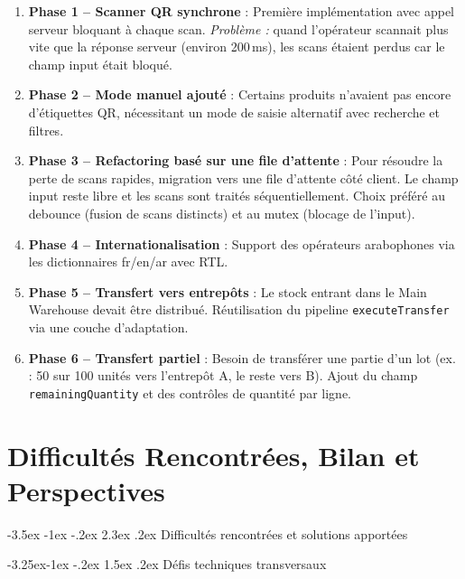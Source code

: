 \documentclass[12pt,a4paper,openany]{report}
\makeatletter
\renewcommand\section{\@startsection{section}{1}{\z@}%
  {-3.5ex \@plus -1ex \@minus -.2ex}%
  {2.3ex \@plus.2ex}%
  {\needspace{10\baselineskip}\normalfont\Large\bfseries\color{primary}}}
\renewcommand\subsection{\@startsection{subsection}{2}{\z@}%
  {-3.25ex\@plus -1ex \@minus -.2ex}%
  {1.5ex \@plus .2ex}%
  {\needspace{8\baselineskip}\normalfont\large\bfseries\color{primary!80!black}}}
\newcommand{\code}[1]{\texttt{#1}}
\makeatother
\begin{document}
\begin{enumerate}
  \item \textbf{Phase 1 -- Scanner QR synchrone} : Première implémentation avec appel serveur bloquant à chaque scan. \textit{Problème :} quand l'opérateur scannait plus vite que la réponse serveur (environ 200\,ms), les scans étaient perdus car le champ input était bloqué.

  \item \textbf{Phase 2 -- Mode manuel ajouté} : Certains produits n'avaient pas encore d'étiquettes QR, nécessitant un mode de saisie alternatif avec recherche et filtres.

  \item \textbf{Phase 3 -- Refactoring basé sur une file d'attente} : Pour résoudre la perte de scans rapides, migration vers une file d'attente côté client. Le champ input reste libre et les scans sont traités séquentiellement. Choix préféré au debounce (fusion de scans distincts) et au mutex (blocage de l'input).

  \item \textbf{Phase 4 -- Internationalisation} : Support des opérateurs arabophones via les dictionnaires fr/en/ar avec RTL.

  \item \textbf{Phase 5 -- Transfert vers entrepôts} : Le stock entrant dans le Main Warehouse devait être distribué. Réutilisation du pipeline \code{executeTransfer} via une couche d'adaptation.

  \item \textbf{Phase 6 -- Transfert partiel} : Besoin de transférer une partie d'un lot (ex. : 50 sur 100 unités vers l'entrepôt A, le reste vers B). Ajout du champ \code{remainingQuantity} et des contrôles de quantité par ligne.
\end{enumerate}


\chapter[Difficultés, Bilan et Perspectives]{Difficultés Rencontrées, Bilan et Perspectives}

\section{Difficultés rencontrées et solutions apportées}

\subsection{Défis techniques transversaux}
\end{document}
